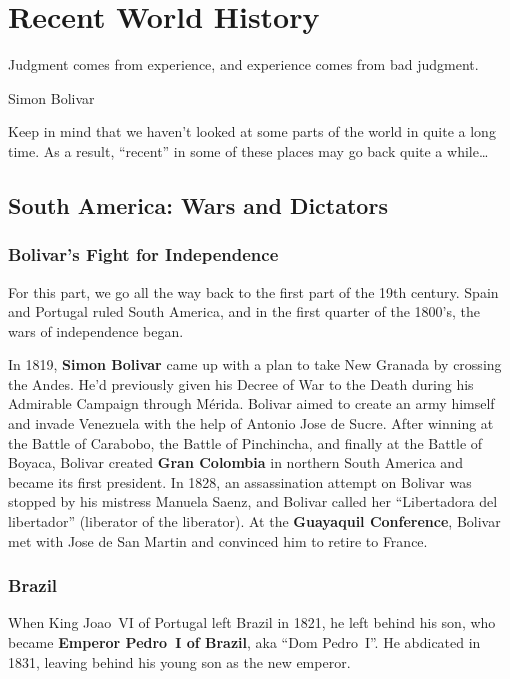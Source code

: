\chapter{Recent World History}

\epigraph{%
  Judgment comes from experience, and experience comes from bad judgment.
}{Simon Bolivar}

Keep in mind that we haven't looked at some parts of the world in quite a long time.
As a result, ``recent'' in some of these places may go back quite a while\ldots{}

\section{South America: Wars and Dictators}

\subsection*{Bolivar's Fight for Independence}

For this part, we go all the way back to the first part of the 19th century.
Spain and Portugal ruled South America, and in the first quarter of the 1800's, the wars of independence began.

In 1819, \textbf{Simon Bolivar} came up with a plan to take New Granada by crossing the Andes.
He'd previously given his Decree of War to the Death during his Admirable Campaign through M\'erida.
Bolivar aimed to create an army himself and invade Venezuela with the help of Antonio Jose de Sucre.
After winning at the Battle of Carabobo, the Battle of Pinchincha, and finally at the Battle of Boyaca,
Bolivar created \textbf{Gran Colombia} in northern South America and became its first president.
In 1828, an assassination attempt on Bolivar was stopped by his mistress Manuela Saenz,
and Bolivar called her ``Libertadora del libertador'' (liberator of the liberator).
At the \textbf{Guayaquil Conference}, Bolivar met with Jose de San Martin and convinced him to retire to France.

\subsection*{Brazil}

When King Joao~VI of Portugal left Brazil in 1821, he left behind his son,
who became \textbf{Emperor Pedro~I of Brazil}, aka ``Dom Pedro~I''.
He abdicated in 1831, leaving behind his young son as the new emperor.

